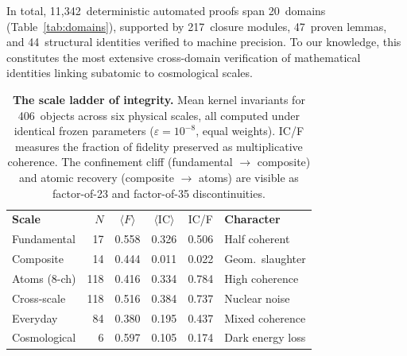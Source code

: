 \documentclass[
  aps,
  prx,
  twocolumn,
  superscriptaddress,
  nofootinbib,
  floatfix
]{revtex4-2}
\newcommand{\eps}{\varepsilon}
\newcommand{\IC}{\mathrm{IC}}
\begin{document}
In total, 11{,}342~deterministic automated proofs span
20~domains (Table~\ref{tab:domains}), supported by
217~closure modules, 47~proven lemmas, and 44~structural
identities verified to machine precision. To our knowledge,
this constitutes the most extensive cross-domain verification
of mathematical identities linking subatomic to cosmological
scales.

\begin{table}[!htbp]
\caption{\textbf{The scale ladder of integrity.} Mean kernel
invariants for 406~objects across six physical scales, all computed
under identical frozen parameters
($\eps = 10^{-8}$, equal weights). IC/F measures the fraction of
fidelity preserved as multiplicative coherence. The confinement cliff
(fundamental $\to$ composite) and atomic recovery (composite $\to$
atoms) are visible as factor-of-23 and factor-of-35 discontinuities.}
\label{tab:scales}
\begin{ruledtabular}
\begin{tabular}{lrcccl}
\textbf{Scale} & $N$ & $\langle F\rangle$ & $\langle\IC\rangle$
  & IC/F & \textbf{Character} \\
\colrule
Fundamental   &  17 & 0.558 & 0.326 & 0.506 & Half coherent \\
Composite     &  14 & 0.444 & 0.011 & 0.022 & \textcolor{CliffRed}{Geom.\ slaughter} \\
Atoms (8-ch)  & 118 & 0.416 & 0.334 & 0.784 & \textcolor{HealGreen}{High coherence} \\
Cross-scale   & 118 & 0.516 & 0.384 & 0.737 & Nuclear noise \\
Everyday      &  84 & 0.380 & 0.195 & 0.437 & Mixed coherence \\
Cosmological  &   6 & 0.597 & 0.105 & 0.174 & Dark energy loss \\
\end{tabular}
\end{ruledtabular}
\end{table}
\end{document}
